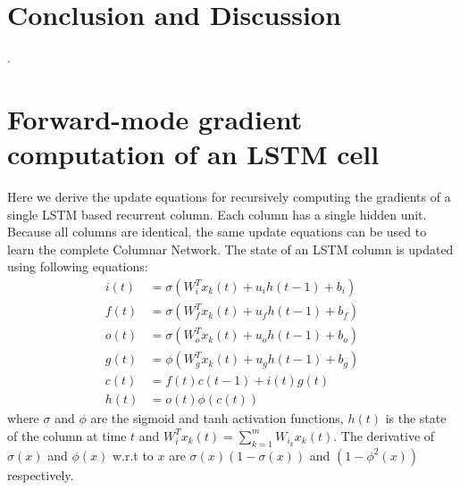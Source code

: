\documentclass{article}
\begin{document}

\section{Conclusion and Discussion} 

 

\nocite{sutton1992adapting}
\nocite{finn2017model}
\nocite{kingma2014adam}
\nocite{rumelhart1986learning}
\nocite{werbos1974beyond}
\nocite{werbos1988generalization}
\nocite{li2017meta}
\nocite{javed2019meta}
\nocite{bengio2019meta}
\nocite{williams1989learning}
\nocite{robinson1987utility}
\nocite{vivek}
\nocite{hochreiter1997long}
\nocite{menick2020practical}
\nocite{tallec2017unbiased}
\nocite{cooijmans2019variance}
\nocite{sutskever2013training}
\nocite{elman1990finding}
\nocite{mikolov2009neural}
\nocite{mikolov2010recurrent}
\nocite{ollivier2015training}
\nocite{bengio1990learning}
\nocite{cho2014learning}
\nocite{glorot2010understanding}
\nocite{mujika2018approximating}
\nocite{williams1990efficient}
\nocite{kapturowski2018recurrent}
\nocite{pllr}
\nocite{schmidhuber1987evolutionary}. 
\nocite{glorot2011deep}
\nocite{Tange2011a}





\onecolumn 
\appendix


\section{Forward-mode gradient computation of an LSTM cell }

Here we derive the update equations for recursively computing the gradients of a single LSTM based recurrent column. Each column has a single hidden unit. Because all columns are identical, the same update equations can be used to learn the complete Columnar Network.  The state of an LSTM column is updated using following equations: 
\begin{align}
i(t) &= \sigma( W_{i}^T x_k(t) + u_{i} h(t-1) + b_i) \label{i} \\
f(t) &= \sigma( W_{f}^T x_k(t) + u_{f} h(t-1) + b_f) \label{f} \\
o(t) &= \sigma( W_{o}^T x_k(t) + u_{o} h(t-1) + b_o) \label{o} \\
g(t) &= \phi( W_{g}^T x_k(t) + u_{g} h(t-1) + b_g) \label{g} \\
c(t) &= f(t)  c(t-1) + i(t) g(t) \label{c} \\
h(t) &= o(t)  \phi(c(t)) \label{state_update}
\end{align}
where $\sigma$ and $\phi$ are the sigmoid and tanh activation functions, $h(t)$ is the state of the column at time $t$ and $ W_{i}^T x_k(t) = \sum_{k=1}^m W_{i_k} x_k(t)$. The derivative of $\sigma(x)$ and $\phi(x)$ w.r.t to $x$ are $\sigma(x)(1-\sigma(x))$ and $(1-\phi^2(x))$ respectively.
\end{document}
